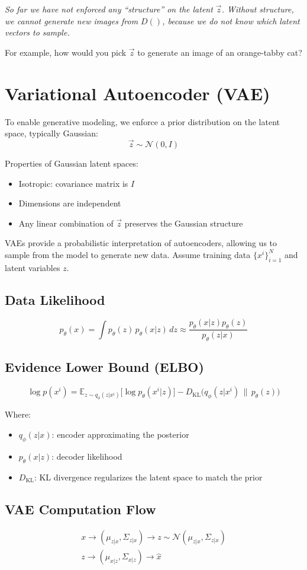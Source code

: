 \documentclass[11pt]{article}
\newcommand{\question}[1]{
    \begin{mdframed}[
        linecolor=gray,       %
        linewidth=0.5pt,      %
        innertopmargin=10pt,  %
        innerbottommargin=10pt %
    ]
    \centering \itshape #1
    \end{mdframed}
}
\theoremstyle{plain}
\begin{document}
\question{
	So far we have not enforced any ``structure'' on the latent $\vec{z}$. Without structure, we cannot generate \textit{new images} from $D()$, because we do not know which latent vectors to sample.

	For example, how would you pick $\vec{z}$ to generate an image of an orange-tabby cat?}

\section{Variational Autoencoder (VAE)}

To enable generative modeling, we enforce a prior distribution on the latent space, typically Gaussian:
\[
	\vec{z} \sim \mathcal{N}(0, I)
\]

Properties of Gaussian latent spaces:
\begin{itemize}
	\item Isotropic: covariance matrix is $I$
	\item Dimensions are independent
	\item Any linear combination of $\vec{z}$ preserves the Gaussian structure
\end{itemize}

VAEs provide a probabilistic interpretation of autoencoders, allowing us to sample from the model to generate new data. Assume training data $\{ x^i \}_{i=1}^N$ and latent variables $z$.

\subsection*{Data Likelihood}
\[
	p_\theta(x) = \int p_\theta(z) \, p_\theta(x|z) \, dz \approx \frac{p_\theta(x|z)p_\theta(z)}{p_\theta(z|x)}
\]

\subsection*{Evidence Lower Bound (ELBO)}
\[
	\log p(x^i) = \mathbb{E}_{z \sim q_\phi(z|x^i)} \Big[ \log p_\theta(x^i|z) \Big] - D_{\text{KL}} \big( q_\phi(z|x^i) \, \| \, p_\theta(z) \big)
\]

Where:
\begin{itemize}
	\item $q_\phi(z|x)$: encoder approximating the posterior
	\item $p_\theta(x|z)$: decoder likelihood
	\item $D_{\text{KL}}$: KL divergence regularizes the latent space to match the prior
\end{itemize}

\subsection*{VAE Computation Flow}
\[
	\begin{gathered}
		x \rightarrow (\mu_{z|x}, \Sigma_{z|x}) \rightarrow z \sim \mathcal{N}(\mu_{z|x}, \Sigma_{z|x}) \\
		z \rightarrow (\mu_{x|z}, \Sigma_{x|z}) \rightarrow \hat{x}
	\end{gathered}
\]
\end{document}
